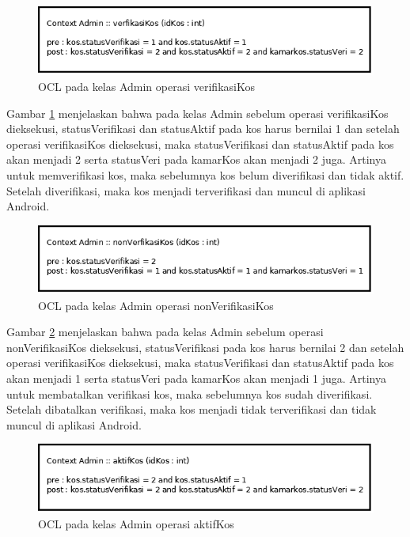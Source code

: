 	\begin{figure}[H]
		\centering
		\includegraphics[scale=0.5]{gambar/ocl/verifikasikos}
		\caption{OCL pada kelas Admin operasi verifikasiKos}
		\label{ocl9}
	\end{figure} 
	
	Gambar \ref{ocl9} menjelaskan bahwa pada kelas Admin sebelum operasi verifikasiKos dieksekusi, statusVerifikasi dan statusAktif pada kos harus bernilai 1 dan setelah operasi verifikasiKos dieksekusi, maka statusVerifikasi dan statusAktif pada kos akan menjadi 2 serta statusVeri pada kamarKos akan menjadi 2 juga. Artinya untuk memverifikasi kos, maka sebelumnya kos belum diverifikasi dan tidak aktif. Setelah diverifikasi, maka kos menjadi terverifikasi dan muncul di aplikasi Android.
	
	\begin{figure}[H]
		\centering
		\includegraphics[scale=0.5]{gambar/ocl/nonVerifikasikos}
		\caption{OCL pada kelas Admin operasi nonVerifikasiKos}
		\label{ocl10}
	\end{figure} 
	
	Gambar \ref{ocl10} menjelaskan bahwa pada kelas Admin sebelum operasi nonVerifikasiKos dieksekusi, statusVerifikasi pada kos harus bernilai 2 dan setelah operasi verifikasiKos dieksekusi, maka statusVerifikasi dan statusAktif pada kos akan menjadi 1 serta statusVeri pada kamarKos akan menjadi 1 juga. Artinya untuk membatalkan verifikasi kos, maka sebelumnya kos sudah diverifikasi. Setelah dibatalkan verifikasi, maka kos menjadi tidak terverifikasi dan tidak muncul di aplikasi Android.
	
	\begin{figure}[H]
		\centering
		\includegraphics[scale=0.5]{gambar/ocl/aktifKos}
		\caption{OCL pada kelas Admin operasi aktifKos}
		\label{ocl11}
	\end{figure} 
	
